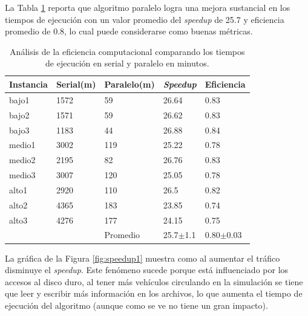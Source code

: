  La Tabla \ref{table:analisis_speedup} reporta que algoritmo paralelo logra una mejora sustancial en los tiempos de ejecución con un valor promedio del \emph{speedup} de 25.7  y  eficiencia promedio de 0.8, lo cual puede considerarse como buenas métricas.

\begin{table}[H]
	\renewcommand{\arraystretch}{1.2}
	\caption[Análisis de la eficiencia computacional.]{Análisis de la eficiencia computacional comparando los tiempos de ejecución en serial y paralelo en minutos. }
	\label{table:analisis_speedup}
	\centering
	\begin{tabular}{p{2.5cm}p{2.5cm}p{2.5cm}p{2.5cm}p{2.5cm} }
		\hline
		
		Instancia& 
		Serial(m) & 
		Paralelo(m) &
		\emph{Speedup} &
		Eficiencia
		\\ 
		\hline
		bajo1  & 1572 & 59 & 26.64 & 0.83\\
		bajo2  & 1571 & 59 & 26.62 & 0.83\\
		bajo3  & 1183 & 44 & 26.88 & 0.84\\
		
		medio1  & 3002 & 119 & 25.22 & 0.78\\
		medio2  & 2195 & 82 & 26.76 & 0.83\\
		medio3  & 3007 & 120 & 25.05 & 0.78\\
		
		alto1  & 2920 & 110 & 26.5 & 0.82\\
		alto2  & 4365 & 183 & 23.85 & 0.74\\
		alto3  & 4276 & 177 & 24.15 & 0.75\\
		\hline
		  &  & Promedio & 25.7$\pm$1.1 & 0.80$\pm$0.03\\
		
		\hline
	\end{tabular}
\end{table}



La gráfica de la Figura \ref{fig:speedup1} muestra como al aumentar el tráfico disminuye el \emph{speedup}. Este fenómeno sucede porque está influenciado por los accesos al disco duro, al tener más vehículos circulando en la simulación se tiene que leer y escribir más información en los archivos, lo que aumenta el tiempo de ejecución del algoritmo (aunque como se ve no tiene un gran impacto).

